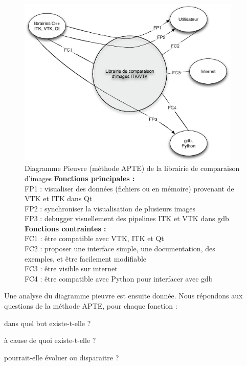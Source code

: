 \begin{figure}[H]
  \begin{center}
  \leavevmode
  \includegraphics[width=0.95\textwidth]{pictures/ComparePIEUVRE}
  \end{center}
  \caption[Diagramme Pieuvre (méthode {APTE\textregistered}) de
    la librairie de comparaison d'images]{Diagramme
    Pieuvre (méthode {APTE\textregistered})
    de la librairie de comparaison d'images
  \small
  \textbf{Fonctions principales :}\\
  FP1 : visualiser des données (fichiers ou en mémoire) provenant 
    de VTK et ITK dans Qt\\
  FP2 : synchroniser la visualisation de plusieurs images\\
  FP3 : debugger visuellement des pipelines ITK et VTK dans gdb\\
    \textbf{Fonctions contraintes :} \\
  FC1 : être compatible avec VTK, ITK et Qt\\
  FC2 : proposer une interface simple, une documentation, des exemples, et être
    facilement modifiable\\
  FC3 : être visible sur internet\\
  FC4 : être compatible avec Python pour interfacer avec gdb}
  \label{fig:PIEUVRECompare}
\end{figure}

Une analyse du diagramme pieuvre est ensuite donnée. Nous répondons aux questions de la méthode {APTE\textregistered}, pour chaque fonction :
\begin{inparaenum}[(i)] 
  \item dans quel but existe-t-elle ?
  \item à cause de quoi existe-t-elle ?
  \item pourrait-elle évoluer ou disparaitre ?
\end{inparaenum}


